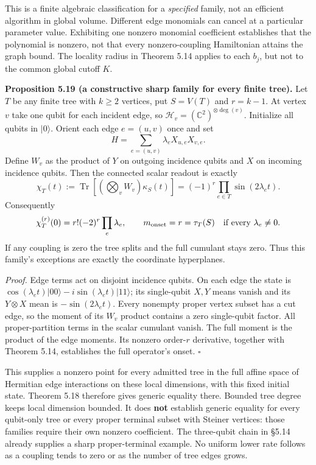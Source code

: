 \documentclass[
  11pt,
]{article}
\begin{document}
This is a finite algebraic classification for a \emph{specified} family, not an
efficient algorithm in global volume. Different edge monomials can cancel
at a particular parameter value. Exhibiting one nonzero monomial coefficient
establishes that the polynomial is nonzero, not that every nonzero-coupling
Hamiltonian attains the graph bound. The locality radius in Theorem 5.14
applies to each \(b_j\), but not to the common global cutoff \(K\).

\textbf{Proposition 5.19 (a constructive sharp family for every finite tree).}
Let \(T\) be any finite tree with \(k\ge2\) vertices, put \(S=V(T)\) and
\(r=k-1\). At vertex \(v\) take one qubit for each incident edge, so
\(\mathcal H_v=(\mathbb C^2)^{\otimes\deg(v)}\). Initialize all qubits in
\(|0\rangle\). Orient each edge \(e=(u,v)\) once and set
\[
 H=\sum_{e=(u,v)}\lambda_e X_{u,e}X_{v,e}.
\]
Define \(W_v\) as the product of \(Y\) on outgoing incidence qubits and \(X\) on
incoming incidence qubits. Then the connected scalar readout is exactly
\[
 \chi_T(t):=\operatorname{Tr}\!\left[
       \left(\bigotimes_vW_v\right)\kappa_S(t)\right]
   =(-1)^r\prod_{e\in T}\sin(2\lambda_e t).
\]
Consequently
\[
 \chi_T^{(r)}(0)=r!(-2)^r\prod_e\lambda_e,
 \qquad m_{\mathrm{onset}}=r=\tau_T(S)
 \quad\hbox{if every }\lambda_e\ne0.
\]
If any coupling is zero the tree splits and the full cumulant stays zero.
Thus this family's exceptions are exactly the coordinate hyperplanes.

\emph{Proof.} Edge terms act on disjoint incidence qubits. On each edge the state
is \(\cos(\lambda_e t)|00\rangle-i\sin(\lambda_e t)|11\rangle\);
its single-qubit \(X,Y\) means vanish and its \(Y\otimes X\) mean is
\(-\sin(2\lambda_e t)\). Every nonempty proper vertex subset has a cut edge,
so the moment of its \(W_v\) product contains a zero single-qubit factor.
All proper-partition terms in the scalar cumulant vanish. The full moment
is the product of the edge moments. Its nonzero order-\(r\) derivative,
together with Theorem 5.14, establishes the full operator's onset. \(\square\)

This supplies a nonzero point for every admitted tree in the full affine
space of Hermitian edge interactions on these local dimensions, with this
fixed initial state. Theorem 5.18 therefore gives generic equality there.
Bounded tree degree keeps local dimension bounded. It does \textbf{not} establish
generic equality for every qubit-only tree or every proper terminal subset
with Steiner vertices: those families require their own nonzero coefficient.
The three-qubit chain in §5.14 already supplies a sharp proper-terminal
example. No uniform lower rate follows as a coupling tends to zero or as
the number of tree edges grows.
\end{document}
